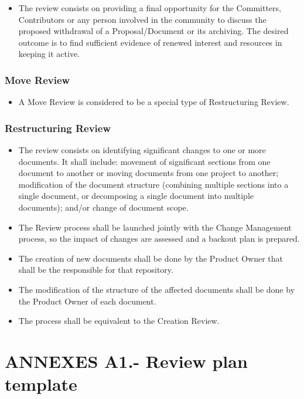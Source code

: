 \documentclass{template/openetcs_article}
\begin{document}
\begin{itemize}
\item The review consists on providing a final opportunity for the Committers, Contributors or any person involved in the community to discuss the proposed withdrawal of a Proposal/Document or its archiving. The desired outcome is to find sufficient evidence of renewed interest and resources in keeping it active.
\end{itemize}

\subsubsection{Move Review}

\begin{itemize}
\item A Move Review is considered to be a special type of Restructuring Review.
\end{itemize}

\subsubsection{Restructuring Review}

\begin{itemize}
\item The review consists on identifying significant changes to one or more documents. It shall include: movement of significant sections from one document to another or moving documents from one project to another; modification of the document structure (combining multiple sections into a single document, or decomposing a single document into multiple documents); and/or change of document scope.
\item The Review process shall be launched jointly with the Change Management process, so the impact of changes are assessed and a backout plan is prepared.
\item The creation of new documents shall be done by the Product Owner that shall be the responsible for that repository.
\item The modification of the structure of the affected documents shall be done by the Product Owner of each document.
\item The process shall be equivalent to the Creation Review. 
\end{itemize}

\section{ANNEXES A1.- Review plan template}
\end{document}
